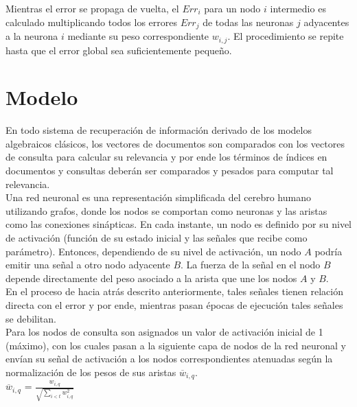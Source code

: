 \documentclass{llncs}
\begin{document}
\begin{multicols}{2}[]
Mientras el error se propaga de vuelta, el $Err_i$ para un nodo $i$ intermedio es calculado multiplicando todos los errores $Err_j$ de todas las neuronas $j$ adyacentes
a la neurona $i$ mediante su peso correspondiente $w_{i,j}$. El procedimiento se repite hasta que el error global sea suficientemente peque\~no. \\

\section{Modelo}

En todo sistema de recuperaci\'on de informaci\'on derivado de los modelos algebraicos cl\'asicos, los vectores de documentos son comparados con los vectores de consulta
para calcular su relevancia y por ende los t\'erminos de \'indices en documentos y consultas deber\'an ser comparados y pesados para computar tal relevancia. \\


Una red neuronal es una representaci\'on simplificada del cerebro humano utilizando grafos, donde los nodos se comportan como neuronas y las aristas como las
conexiones sin\'apticas. En cada instante, un nodo es definido por su nivel de activaci\'on (funci\'on de su estado inicial y las se\~nales que recibe como par\'ametro).
Entonces, dependiendo de su nivel de activaci\'on, un nodo $A$ podr\'ia emitir una se\~nal a otro nodo adyacente $B$. La fuerza de la se\~nal en el nodo $B$
depende directamente del peso asociado a la arista que une los nodos $A$ y $B$.\\

En el proceso de hacia atr\'as descrito anteriormente, tales se\~nales tienen relaci\'on directa con el error y por ende, mientras pasan \'epocas de ejecuci\'on tales
se\~nales se debilitan.\\

Para los nodos de consulta son asignados un valor de activaci\'on inicial de 1 (m\'aximo), con los cuales pasan a la siguiente capa de nodos de la red neuronal y env\'ian
su se\~nal de activaci\'on a los nodos correspondientes atenuadas seg\'un la normalizaci\'on de los pesos de sus aristas $\overline{w}_{i,q}$.\\

$\overline{w}_{i, q}$ = $\frac{w_{i, q}}{\sqrt{\sum_{i < t}{w^2_{i, q}}}}$ \\


\end{multicols}
\end{document}
